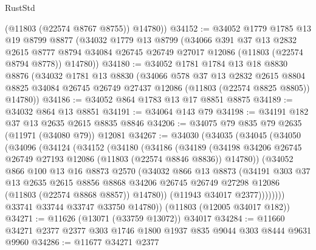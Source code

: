 \begin{lexlean}{RustStd}
\begin{coremodule}
        (@11803 (@22574 @8767 @8755))
        @14780))
@34152 := @34052
    @1779
    @1785
    @13
    @19
    @8799
    @8877
    (@34032
      @1779
      @13
      @8799
      (@34066
        @391
        @37
        @13
        @2832
        @2615
        @8777
        @8794
        @34084
        @26745
        @26749
        @27017
        @12086
        (@11803 (@22574 @8794 @8778))
        @14780))
@34180 := @34052
    @1781
    @1784
    @13
    @18
    @8830
    @8876
    (@34032
      @1781
      @13
      @8830
      (@34066
        @578
        @37
        @13
        @2832
        @2615
        @8804
        @8825
        @34084
        @26745
        @26749
        @27437
        @12086
        (@11803 (@22574 @8825 @8805))
        @14780))
@34186 := @34052 @864 @1783 @13 @17 @8851 @8875
@34189 := @34032 @864 @13 @8851
@34191 := @34064 @143 @79
@34198 := @34191 @182 @37 @13 @2635 @2615 @8835 @8846
@34206 := @34075 @79 @835 @79 @2635 (@11971 (@34080 @79)) @12081
@34267 := @34030
    (@34035
      (@34045
        (@34050
          (@34096
            (@34124
              (@34152
                (@34180
                  (@34186
                    (@34189
                      (@34198
                        @34206
                        @26745
                        @26749
                        @27193
                        @12086
                        (@11803 (@22574 @8846 @8836))
                        @14780))
                    (@34052
                      @866
                      @100
                      @13
                      @16
                      @8873
                      @2570
                      (@34032
                        @866
                        @13
                        @8873
                        (@34191
                          @303
                          @37
                          @13
                          @2635
                          @2615
                          @8856
                          @8868
                          @34206
                          @26745
                          @26749
                          @27298
                          @12086
                          (@11803 (@22574 @8868 @8857))
                          @14780))
                      (@11943 @34017 @2377))))))))
        @33741
        @33744
        @33747
        @33750
        @14780))
    (@11803 (@12005 @34017 @182))
@34271 := @11626 (@13071 (@33759 @13072)) @34017
@34284 := @11660 @34271 @2377 @2377 @303 @1746 @1800 @1937 @835 @9044 @303 @8444 @9631 @9960
@34286 := @11677 @34271 @2377

\end{coremodule}
\end{lexlean}
